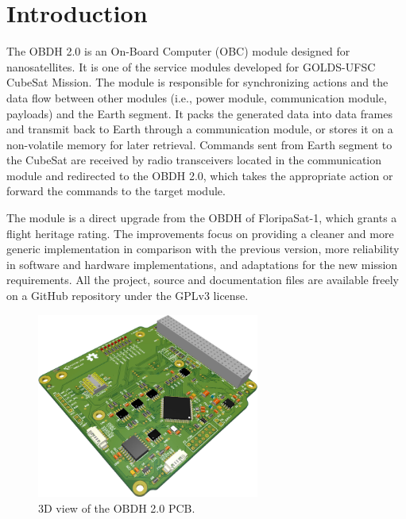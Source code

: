 %
%
%
%
%

%
%
%
%
%
%

\chapter{Introduction} \label{ch:introduction}

The OBDH 2.0 is an On-Board Computer (OBC) module designed for nanosatellites. It is one of the service modules developed for GOLDS-UFSC CubeSat Mission. The module is responsible for synchronizing actions and the data flow between other modules (i.e., power module, communication module, payloads) and the Earth segment. It packs the generated data into data frames and transmit back to Earth through a communication module, or stores it on a non-volatile memory for later retrieval. Commands sent from Earth segment to the CubeSat are received by radio transceivers located in the communication module and redirected to the OBDH 2.0, which takes the appropriate action or forward the commands to the target module.

The module is a direct upgrade from the OBDH of FloripaSat-1, which grants a flight heritage rating. The improvements focus on providing a cleaner and more generic implementation in comparison with the previous version, more reliability in software and hardware implementations, and adaptations for the new mission requirements. All the project, source and documentation files are available freely on a GitHub repository \cite{obdh2-repo} under the GPLv3 license.


\begin{figure}[!ht]
    \begin{center}
        \includegraphics[width=0.65\textwidth]{figures/obdh2-pcb-3d.png}
        \caption{3D view of the OBDH 2.0 PCB.}
        \label{fig:pcb-3d}
    \end{center}
\end{figure}
